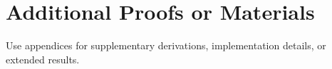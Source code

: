 \chapter{Additional Proofs or Materials}
\label{app:proofs}

Use appendices for supplementary derivations, implementation details, or
extended results.
